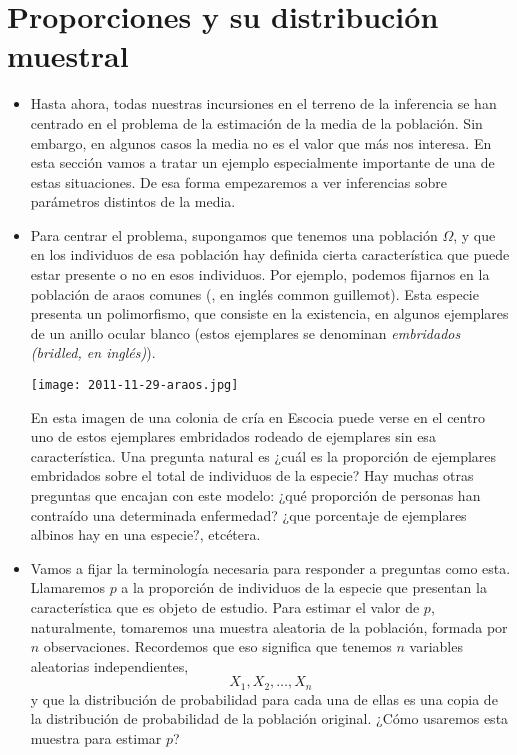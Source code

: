 

\section{Proporciones y su distribución muestral}

\begin{itemize}

    \item Hasta ahora, todas nuestras incursiones en el terreno de la inferencia se han centrado en el problema de la estimación de la media de la población. Sin embargo, en algunos casos la media no es el valor que más nos interesa. En esta sección vamos a tratar un ejemplo especialmente importante de una de estas situaciones. De esa forma empezaremos a ver inferencias sobre parámetros distintos de la media.

     \item  Para centrar el problema, supongamos que tenemos una población $\Omega$, y que en los individuos de esa población hay definida cierta característica que puede estar presente o no en esos individuos. Por ejemplo, podemos fijarnos en la población de araos comunes (, en inglés common guillemot). Esta especie presenta un polimorfismo, que consiste en la existencia, en algunos ejemplares de un anillo ocular blanco (estos ejemplares se denominan {\em embridados (bridled, en inglés)}).
         \begin{center}
         \texttt{[image: 2011-11-29-araos.jpg]}
         \end{center}
         En esta imagen de una colonia de cría en Escocia puede verse en el centro uno de estos ejemplares embridados rodeado de ejemplares sin esa característica. Una pregunta natural es ¿cuál es la proporción de ejemplares embridados sobre el total de individuos de la especie? Hay muchas otras preguntas que encajan con este modelo: ¿qué proporción de personas han contraído una determinada enfermedad? ¿que porcentaje de ejemplares albinos hay en una especie?, etcétera.

    \item Vamos a fijar la terminología necesaria para responder a preguntas como esta. Llamaremos $p$ a la proporción de individuos de la especie que presentan la característica que es objeto de estudio. Para estimar el valor de $p$, naturalmente, tomaremos una muestra aleatoria de la población, formada por $n$ observaciones. Recordemos que eso significa que tenemos $n$ variables aleatorias independientes,
        \[X_1,X_2,\ldots,X_n\]
        y que la distribución de probabilidad para cada una de ellas es una copia de la distribución de probabilidad de la población original. ¿Cómo usaremos esta muestra para estimar $p$?


\end{itemize}
